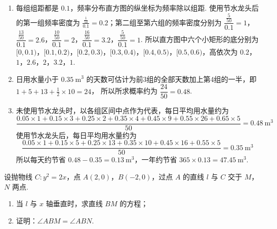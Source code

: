 \begin{solution}
\begin{enumerate}
\item 每组组距都是 \(0.1\)，频率分布直方图的纵坐标为频率除以组距. 使用节水龙头后的第一组频率密度为 \(\frac{\frac{1}{50}}{0.1}=0.2\)；第二组至第六组的频率密度分别为 \(\dfrac{\frac{5}{50}}{0.1}=1\)，\(\dfrac{\frac{13}{50}}{0.1}=2.6\)，\(\dfrac{\frac{10}{50}}{0.1}=2\)，\(\dfrac{\frac{16}{50}}{0.1}=3.2\)，\(\dfrac{\frac{5}{50}}{0.1}=1\).
所以直方图中六个小矩形的底分别为 \([0,0.1)\)，\([0.1,0.2)\)，\([0.2,0.3)\)，\([0.3,0.4)\)，\([0.4,0.5)\)，\([0.5,0.6)\)，高依次为 \(0.2\)，\(1\)，\(2.6\)，\(2\)，\(3.2\)，\(1\).
\item 日用水量小于 \(0.35\mathrm{~m}^3\) 的天数可估计为前3组的全部天数加上第4组的一半，即
\(1+5+13+\frac12\times10=24\)，
所以所求概率约为 \(\dfrac{24}{50}=0.48\).
\item 未使用节水龙头时，以各组区间中点作为代表，每日平均用水量约为
\[
\frac{0.05\times1+0.15\times3+0.25\times2+0.35\times4+0.45\times9+0.55\times26+0.65\times5}{50}=0.48\mathrm{~m}^3
\]
使用节水龙头后，每日平均用水量约为
\[
\frac{0.05\times1+0.15\times5+0.25\times13+0.35\times10+0.45\times16+0.55\times5}{50}=0.35\mathrm{~m}^3
\]
所以每天约节省 \(0.48-0.35=0.13\mathrm{~m}^3\)，一年约节省 \(365\times0.13=47.45\mathrm{~m}^3\).
\end{enumerate}
\end{solution}

\begin{problem}
设抛物线 \(C:y^2=2x\)，点 \(A(2,0)\)，\(B(-2,0)\)，过点 \(A\) 的直线 \(l\) 与 \(C\) 交于 \(M\)，\(N\) 两点.

\begin{enumerate}
\item 当 \(l\) 与 \(x\) 轴垂直时，求直线 \(BM\) 的方程；
\item 证明：\(\angle ABM=\angle ABN\).
\end{enumerate}
\end{problem}

